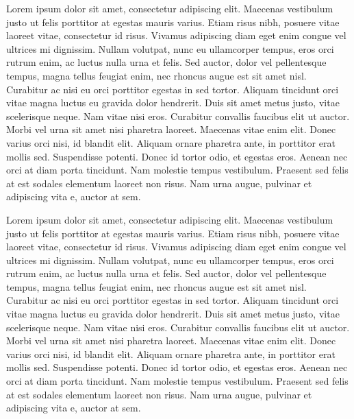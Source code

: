 \documentclass{ansarticle}
\begin{document}
Lorem ipsum dolor sit amet, consectetur adipiscing elit. Maecenas
vestibulum justo ut felis porttitor at egestas mauris varius. Etiam
risus nibh, posuere vitae laoreet vitae, consectetur id risus. Vivamus
adipiscing diam eget enim congue vel ultrices mi dignissim. Nullam
volutpat, nunc eu ullamcorper tempus, eros orci rutrum enim, ac luctus
nulla urna et felis. Sed auctor, dolor vel pellentesque tempus, magna
tellus feugiat enim, nec rhoncus augue est sit amet nisl. Curabitur ac
nisi eu orci porttitor egestas in sed tortor. Aliquam tincidunt orci
vitae magna luctus eu gravida dolor hendrerit. Duis sit amet metus
justo, vitae scelerisque neque. Nam vitae nisi eros. Curabitur
convallis faucibus elit ut auctor. Morbi vel urna sit amet nisi
pharetra laoreet. Maecenas vitae enim elit. Donec varius orci nisi, id
blandit elit. Aliquam ornare pharetra ante, in porttitor erat mollis
sed. Suspendisse potenti. Donec id tortor odio, et egestas
eros. Aenean nec orci at diam porta tincidunt. Nam molestie tempus
vestibulum. Praesent sed felis at est sodales elementum laoreet non
risus. Nam urna augue, pulvinar et adipiscing vita
e, auctor at sem.

Lorem ipsum dolor sit amet, consectetur adipiscing elit. Maecenas
vestibulum justo ut felis porttitor at egestas mauris varius. Etiam
risus nibh, posuere vitae laoreet vitae, consectetur id risus. Vivamus
adipiscing diam eget enim congue vel ultrices mi dignissim. Nullam
volutpat, nunc eu ullamcorper tempus, eros orci rutrum enim, ac luctus
nulla urna et felis. Sed auctor, dolor vel pellentesque tempus, magna
tellus feugiat enim, nec rhoncus augue est sit amet nisl. Curabitur ac
nisi eu orci porttitor egestas in sed tortor. Aliquam tincidunt orci
vitae magna luctus eu gravida dolor hendrerit. Duis sit amet metus
justo, vitae scelerisque neque. Nam vitae nisi eros. Curabitur
convallis faucibus elit ut auctor. Morbi vel urna sit amet nisi
pharetra laoreet. Maecenas vitae enim elit. Donec varius orci nisi, id
blandit elit. Aliquam ornare pharetra ante, in porttitor erat mollis
sed. Suspendisse potenti. Donec id tortor odio, et egestas
eros. Aenean nec orci at diam porta tincidunt. Nam molestie tempus
vestibulum. Praesent sed felis at est sodales elementum laoreet non
risus. Nam urna augue, pulvinar et adipiscing vita
e, auctor at sem.
\end{document}
